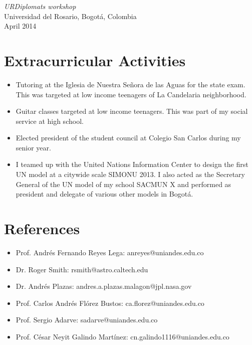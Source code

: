 \documentclass[line,margin]{res}
\begin{document}
\begin{resume}
{\sl URDiplomats workshop} \\
Universidad del Rosario, Bogotá, Colombia \\
April 2014  
 
\section{Extracurricular Activities}

\begin{itemize}

\item Tutoring at the Iglesia de Nuestra Señora de las Aguas for the state exam. This was targeted at low income teenagers of La Candelaria neighborhood. 

\item Guitar classes targeted at low income teenagers. This was part of my social service at high school.

\item Elected president of the student council at Colegio San Carlos during my senior year.

\item I teamed up with the United Nations Information Center to design the first UN model at a citywide scale SIMONU 2013. I also acted as the Secretary General of the UN model of my school SACMUN X and performed as president and delegate of various other models in Bogotá.

\end{itemize}  
  
\section{References}  

\begin{itemize}

\item Prof. Andrés Fernando Reyes Lega: anreyes@uniandes.edu.co

\item Dr. Roger Smith: rsmith@astro.caltech.edu 

\item Dr. Andrés Plazas: andres.a.plazas.malagon@jpl.nasa.gov

\item Prof. Carlos Andrés Flórez Bustos: ca.florez@uniandes.edu.co

\item Prof. Sergio Adarve: sadarve@uniandes.edu.co

\item Prof. César Neyit Galindo Martínez: cn.galindo1116@uniandes.edu.co

\end{itemize}
  
\end{resume}
\end{document}
